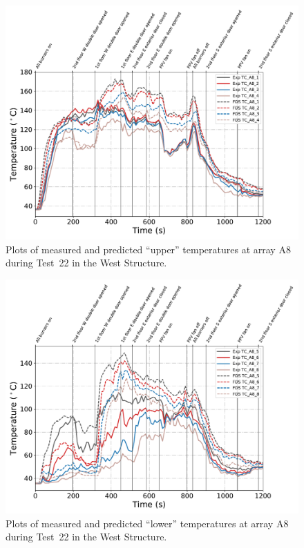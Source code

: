 \begin{figure}[!h]
	\centering
	\includegraphics[width=\columnwidth]{Figures/Plots/Validation/Temperature/Test_22_TC_A8_upper}
	\caption{Plots of measured and predicted ``upper'' temperatures at array A8 during Test~22 in the West Structure.}
	\label{fig:TCA8_upper_data_Test22}
\end{figure}

\begin{figure}[!h]
	\centering
	\includegraphics[width=\columnwidth]{Figures/Plots/Validation/Temperature/Test_22_TC_A8_lower}
	\caption{Plots of measured and predicted ``lower'' temperatures at array A8 during Test~22 in the West Structure.}
	\label{fig:TCA8_lower_data_Test22}
\end{figure}

